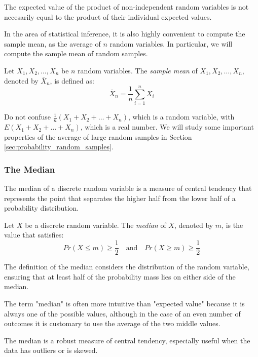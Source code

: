 The expected value of the product of non-independent random variables is not necesarily equal to the product of their individual expected values.

In the area of statistical inference, it is also highly convenient to compute the sample mean, as the average of $n$ random variables. In particular, we will compute the sample mean of random samples.

\begin{definition}
Let $X_1, X_2, \ldots, X_n$ be $n$ random variables. The \emph{sample mean} of $X_1, X_2, \ldots, X_n$, denoted by $\bar{X}_n$, is defined as:
\[
\bar{X}_n = \frac{1}{n} \sum_{i=1}^n X_i
\]
\end{definition}

Do not confuse $\frac{1}{n} \left( X_1 + X_2 + \ldots + X_n \right)$, which is a random variable, with $E \left( X_1 + X_2 + \ldots + X_n \right)$, which is a real number. We will study some important properties of the average of large random samples in Section \ref{sec:probability_random_samples}.


\subsubsection*{The Median}

The median of a discrete random variable is a measure of central tendency that represents the point that separates the higher half from the lower half of a probability distribution.

\begin{definition}
Let $X$ be a discrete random variable. The \emph{median} of $X$, denoted by $m$, is the value that satisfies:
\[
Pr\left(X\leq m\right)\geq \frac{1}{2} \quad \text{and} \quad Pr\left(X\geq m\right)\geq \frac{1}{2}
\]
\end{definition}

The definition of the median considers the distribution of the random variable, ensuring that at least half of the probability mass lies on either side of the median.

The term "median" is often more intuitive than "expected value" because it is always one of the possible values, although in the case of an even number of outcomes it is customary to use the average of the two middle values.

The median is a robust measure of central tendency, especially useful when the data has outliers or is skewed.

